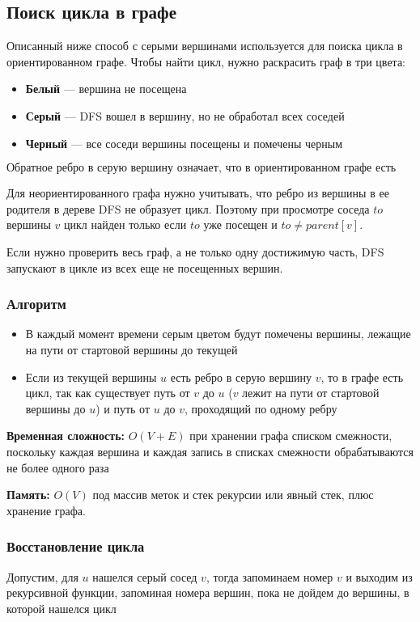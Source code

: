 \documentclass[a4paper]{article}
\begin{document}
\subsection{Поиск цикла в графе}
Описанный ниже способ с серыми вершинами используется для поиска цикла в ориентированном графе. Чтобы найти цикл, нужно раскрасить граф в три цвета:

\begin{itemize}
    \item \textbf{Белый} — вершина не посещена
    \item \textbf{Серый} — DFS вошел в вершину, но не обработал всех соседей
    \item \textbf{Черный} — все соседи вершины посещены и помечены черным
\end{itemize}

\[
    \boxed{\text{Обратное ребро в серую вершину означает, что в ориентированном графе есть цикл}}
\]

Для неориентированного графа нужно учитывать, что ребро из вершины в ее родителя в дереве DFS не образует цикл. Поэтому при просмотре соседа $to$ вершины $v$ цикл найден только если $to$ уже посещен и $to \neq parent[v]$.

Если нужно проверить весь граф, а не только одну достижимую часть, DFS запускают в цикле из всех еще не посещенных вершин.


\subsubsection*{Алгоритм}
\begin{itemize}
    \item В каждый момент времени серым цветом будут помечены вершины, лежащие на пути \dfs от стартовой вершины до текущей
    \item Если из текущей вершины $u$ есть ребро в серую вершину $v$, то в графе есть цикл, так как существует путь от $v$ до $u$ ($v$ лежит на пути от стартовой вершины до $u$) и путь от $u$ до $v$, проходящий по одному ребру
\end{itemize}

\textbf{Временная сложность:} $O(V + E)$ при хранении графа списком смежности, поскольку каждая вершина и каждая запись в списках смежности обрабатываются не более одного раза

\textbf{Память:} $O(V)$ под массив меток и стек рекурсии или явный стек, плюс хранение графа.

\subsubsection*{Восстановление цикла}
Допустим, для $u$ нашелся серый сосед $v$, тогда запоминаем номер $v$ и выходим из рекурсивной функции, запоминая номера вершин, пока не дойдем до вершины, в которой нашелся цикл 
 
\end{document}

